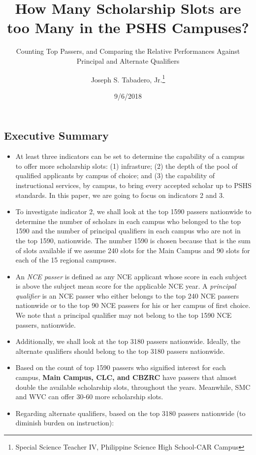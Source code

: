 \documentclass[]{article}
\title{How Many Scholarship Slots are too Many in the PSHS Campuses?}
\subtitle{Counting Top Passers, and Comparing the Relative Performances Against
Principal and Alternate Qualifiers}
\author{Joseph S. Tabadero,
Jr.\thanks{Special Science Teacher IV, Philippine Science High School-CAR Campus}}
\date{9/6/2018}
\providecommand{\tightlist}{%
  \setlength{\itemsep}{0pt}\setlength{\parskip}{0pt}}
\begin{document}
\maketitle

\hypertarget{executive-summary}{%
\subsection{Executive Summary}\label{executive-summary}}

\begin{itemize}
\tightlist
\item
  At least three indicators can be set to determine the capability of a
  campus to offer more scholarship slots: (1) infrasture; (2) the depth
  of the pool of qualified applicants by campus of choice; and (3) the
  capability of instructional services, by campus, to bring every
  accepted scholar up to PSHS standards. In this paper, we are going to
  focus on indicators 2 and 3.
\item
  To investigate indicator 2, we shall look at the top 1590 passers
  nationwide to determine the number of scholars in each campus who
  belonged to the top 1590 and the number of principal qualifiers in
  each campus who are not in the top 1590, nationwide. The number 1590
  is chosen because that is the sum of slots available if we assume 240
  slots for the Main Campus and 90 slots for each of the 15 regional
  campuses.
\item
  An \emph{NCE passer} is defined as any NCE applicant whose score in
  each subject is above the subject mean score for the applicable NCE
  year. A \emph{principal qualifier} is an NCE passer who either belongs
  to the top 240 NCE passers nationwide or to the top 90 NCE passers for
  his or her campus of first choice. We note that a principal qualifier
  may not belong to the top 1590 NCE passers, nationwide.
\item
  Additionally, we shall look at the top 3180 passers nationwide.
  Ideally, the alternate qualifiers should belong to the top 3180
  passers nationwide.
\item
  Based on the count of top 1590 passers who signified interest for each
  campus, \textbf{Main Campus, CLC, and CBZRC} have passers that almost
  double the available scholarship slots, throughout the years.
  Meanwhile, SMC and WVC can offer 30-60 more scholarship slots.
\item
  Regarding alternate qualifiers, based on the top 3180 passers
  nationwide (to diminish burden on instruction):


\end{itemize}
\end{document}

